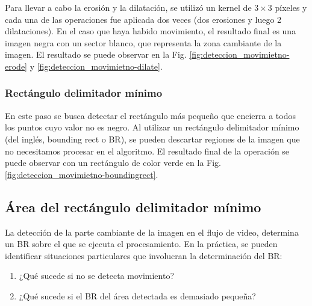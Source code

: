 Para llevar a cabo la erosión y la dilatación, se utilizó un kernel de $3 \times 3$ píxeles y cada una de las operaciones fue aplicada dos veces (dos erosiones y luego 2 dilataciones). En el caso que haya habido movimiento, el resultado final es una imagen negra con un sector blanco, que representa la zona cambiante de la imagen. El resultado se puede observar en la Fig. \ref{fig:deteccion_movimietno-erode} y \ref{fig:deteccion_movimietno-dilate}.
\subsubsection{Rectángulo delimitador mínimo}
\label{subsubsec:bounding_rect}
En este paso se busca detectar el rectángulo más pequeño que encierra a todos los puntos cuyo valor no es negro. Al utilizar un rectángulo delimitador mínimo (del inglés, bounding rect o BR), se pueden descartar regiones de la imagen que no necesitamos procesar en el algoritmo. %
El resultado final de la operación se puede observar con un rectángulo de color verde en la Fig. \ref{fig:deteccion_movimietno-boundingrect}.
\subsection{Área del rectángulo delimitador mínimo}
\label{subsec:validacion_area_boundingrect}
La detección de la parte cambiante de la imagen en el flujo de video, determina un BR sobre el que se ejecuta el procesamiento. En la práctica, se pueden identificar situaciones particulares que involucran la determinación del BR:
\begin{enumerate}
 \item ¿Qué sucede si no se detecta movimiento?
 \item ¿Qué sucede si el BR del área detectada es demasiado pequeña?
\end{enumerate}

